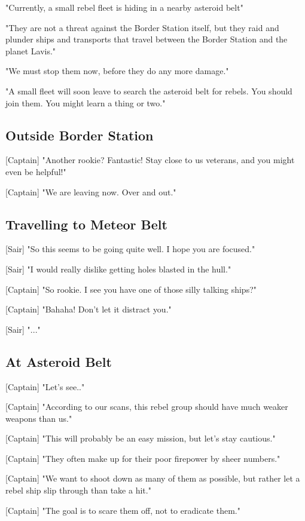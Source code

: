 \documentclass[a4paper,12pt]{article}
\begin{document}
"Currently, a small rebel fleet is hiding in a nearby asteroid belt"

"They are not a threat against the Border Station itself, but they raid and plunder ships
and transports that travel between the Border Station and the planet Lavis."

"We must stop them now, before they do any more damage." 

"A small fleet will soon leave to search the asteroid belt for rebels. You should join them.
You might learn a thing or two."

\subsection{Outside Border Station}

[Captain] "Another rookie? Fantastic! Stay close to us veterans, and
you might even be helpful!" 

[Captain] "We are leaving now. Over and out."

\subsection{Travelling to Meteor Belt}

[Sair] "So this seems to be going quite well. I hope you are focused."

[Sair] "I would really dislike getting holes blasted in the hull."

[Captain] "So rookie. I see you have one of those silly talking ships?" 

[Captain] "Bahaha! Don't let it distract you."

[Sair] "..."

\subsection{At Asteroid Belt}

[Captain] "Let's see.." 

[Captain] "According to our scans, this rebel group should have much weaker weapons than us."

[Captain] "This will probably be an easy mission, but let's stay cautious."

[Captain] "They often make up for their poor firepower by sheer numbers."

[Captain] "We want to shoot down as many of them as possible, but rather let a rebel ship slip through than take a hit."

[Captain] "The goal is to scare them off, not to eradicate them."
\end{document}
